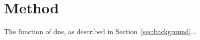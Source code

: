 \section{Method} \label{sec:method}
The function of \ac{dns}, as described in Section~\ref{sec:background}...
